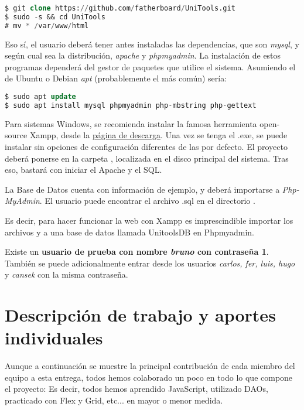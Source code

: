 \documentclass[12pt]{report}
\begin{document}
\begin{lstlisting}[language=SQL]
$ git clone https://github.com/fatherboard/UniTools.git
$ sudo -s && cd UniTools
# mv * /var/www/html
\end{lstlisting}
Eso sí, el usuario deberá tener antes instaladas las dependencias, que son \textit{mysql}, y según cual sea la distribución, \textit{apache} y \textit{phpmyadmin}. La instalación de estos programas dependerá del gestor de paquetes que utilice el sistema. Asumiendo el de Ubuntu o Debian \textit{apt} (probablemente el más común) sería:
\newline
\begin{lstlisting}[language=SQL]
$ sudo apt update
$ sudo apt install mysql phpmyadmin php-mbstring php-gettext
\end{lstlisting}
Para sistemas Windows, se recomienda instalar la famosa herramienta open-source Xampp, desde la \hyperlink{https://www.apachefriends.org/download.html}{página de descarga}. Una vez se tenga el .exe, se puede instalar sin opciones de configuración diferentes de las por defecto. El proyecto deberá ponerse en la carpeta , localizada en el disco principal del sistema. Tras eso, bastará con iniciar el Apache y el SQL.

La Base de Datos cuenta con información de ejemplo, y deberá importarse a \textit{Php-MyAdmin}. El usuario puede encontrar el archivo .sql en el directorio .

Es decir, para hacer funcionar la web con Xampp es imprescindible importar los archivos  y  a una base de datos llamada UnitoolsDB en Phpmyadmin.

Existe un \textbf{usuario de prueba con nombre \textit{bruno} con contraseña 1}. También se puede adicionalmente entrar desde los usuarios \textit{carlos, fer, luis, hugo} y \textit{cansek} con la misma contraseña.

\newpage

\section{Descripción de trabajo y aportes individuales}

Aunque a continuación se muestre la principal contribución de cada miembro del equipo a esta entrega, todos hemos colaborado un poco en todo lo que compone el proyecto: Es decir, todos hemos aprendido JavaScript, utilizado DAOs, practicado con Flex y Grid, etc... en mayor o menor medida.
\end{document}
